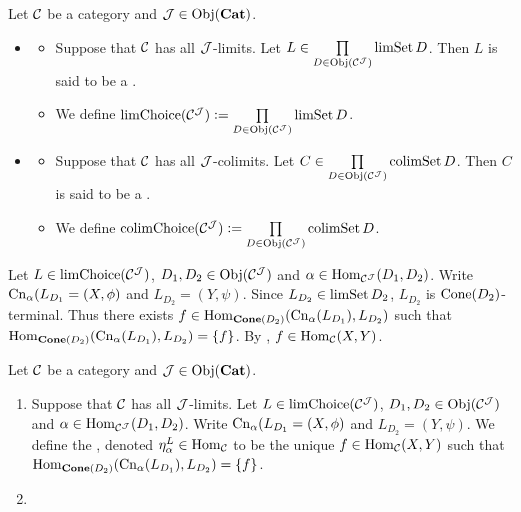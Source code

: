 \documentclass{book}
\begin{document}
\begin{defn} 
	Let $\MC$ be a category and $\MJ \in \Obj(\bCat)$.  
	\begin{itemize}
		\item 
		\begin{itemize}
			\item Suppose that $\MC$ has all $\MJ$-limits. Let $L \in \prod\limits_{D \in \Obj(\MC^{\MJ})} \limSet D$. Then $L$ is said to be a .
			\item We define $\limChoice(\MC^{\MJ}) \defeq \prod\limits_{D \in \Obj(\MC^{\MJ})} \limSet D$.
		\end{itemize}
		\item 
		\begin{itemize}
			\item Suppose that $\MC$ has all $\MJ$-colimits. Let $C \in \prod\limits_{D \in \Obj(\MC^{\MJ})} \colimSet D$. Then $C$ is said to be a .
			\item We define $\colimChoice(\MC^{\MJ}) \defeq \prod\limits_{D \in \Obj(\MC^{\MJ})} \colimSet D$.
		\end{itemize}
	\end{itemize}
\end{defn}

\begin{note}
	Let $L \in \limChoice(\MC^{\MJ})$, $D_1, D_2 \in \Obj(\MC^{\MJ})$ and $\al \in \Hom_{\MC^{\MJ}}(D_1, D_2)$. Write $\Cn_{\al}(L_{D_1} = (X, \phi)$ and $L_{D_2} = (Y, \psi)$. Since $L_{D_2} \in \limSet D_2$, $L_{D_2}$ is $\Cone(D_2)$-terminal. Thus there exists $f \in \Hom_{\bCone(D_2)}(\Cn_{\al}(L_{D_1}), L_{D_2})$ such that $\Hom_{\bCone(D_2)}(\Cn_{\al}(L_{D_1}), L_{D_2}) = \{f\}$. By , $f \in \Hom_{\MC}(X, Y)$.
\end{note}

\begin{defn} 
	Let $\MC$ be a category and $\MJ \in \Obj(\bCat)$.
	\begin{enumerate}
		\item Suppose that $\MC$ has all $\MJ$-limits. Let $L \in \limChoice(\MC^{\MJ})$, $D_1, D_2 \in \Obj(\MC^{\MJ})$ and $\al \in \Hom_{\MC^{\MJ}}(D_1, D_2)$. Write $\Cn_{\al}(L_{D_1} = (X, \phi)$ and $L_{D_2} = (Y, \psi)$. We define the , denoted $\eta_{\al}^L \in \Hom_{\MC}$ to be the unique $f \in \Hom_{\MC}(X, Y)$ such that $\Hom_{\bCone(D_2)}(\Cn_{\al}(L_{D_1}), L_{D_2}) = \{f\}$.
		\item {}
	\end{enumerate}
\end{defn}
\end{document}
